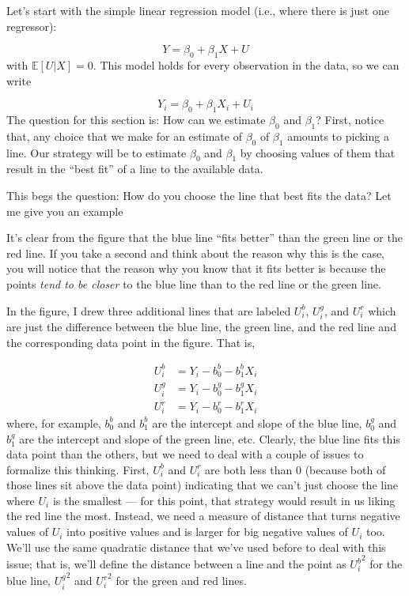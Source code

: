 \documentclass[
  letterpaper,
  DIV=11,
  numbers=noendperiod]{scrreprt}
\begin{document}
Let's start with the simple linear regression model (i.e., where there
is just one regressor):

\[
  Y = \beta_0 + \beta_1 X + U
\] with \(\mathbb{E}[U|X]=0\). This model holds for every observation in
the data, so we can write

\[
  Y_i = \beta_0 + \beta_1 X_i + U_i
\] The question for this section is: How can we estimate \(\beta_0\) and
\(\beta_1\)? First, notice that, any choice that we make for an estimate
of \(\beta_0\) of \(\beta_1\) amounts to picking a line. Our strategy
will be to estimate \(\beta_0\) and \(\beta_1\) by choosing values of
them that result in the ``best fit'' of a line to the available data.

This begs the question: How do you choose the line that best fits the
data? Let me give you an example

It's clear from the figure that the blue line ``fits better'' than the
green line or the red line. If you take a second and think about the
reason why this is the case, you will notice that the reason why you
know that it fits better is because the points \emph{tend to be closer}
to the blue line than to the red line or the green line.

In the figure, I drew three additional lines that are labeled \(U_i^b\),
\(U_i^g\), and \(U_i^r\) which are just the difference between the blue
line, the green line, and the red line and the corresponding data point
in the figure. That is,

\[
  \begin{aligned}
  U_i^b &= Y_i - b_0^b - b_1^b X_i \\
  U_i^g &= Y_i - b_0^g - b_1^g X_i \\
  U_i^r &= Y_i - b_0^r - b_1^r X_i
  \end{aligned}
\] where, for example, \(b_0^b\) and \(b_1^b\) are the intercept and
slope of the blue line, \(b_0^g\) and \(b_1^g\) are the intercept and
slope of the green line, etc. Clearly, the blue line fits this data
point than the others, but we need to deal with a couple of issues to
formalize this thinking. First, \(U_i^b\) and \(U_i^r\) are both less
than 0 (because both of those lines sit above the data point) indicating
that we can't just choose the line where \(U_i\) is the smallest --- for
this point, that strategy would result in us liking the red line the
most. Instead, we need a measure of distance that turns negative values
of \(U_i\) into positive values and is larger for big negative values of
\(U_i\) too. We'll use the same quadratic distance that we've used
before to deal with this issue; that is, we'll define the distance
between a line and the point as \({U_i^b}^2\) for the blue line,
\({U_i^g}^2\) and \({U_i^r}^2\) for the green and red lines.
\end{document}
